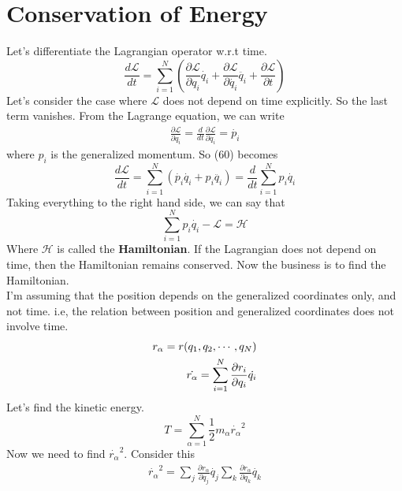 \documentclass[12pt]{article}
\begin{document}
    \section{Conservation of Energy}
    Let's differentiate the Lagrangian operator w.r.t time.
    \begin{equation}
        \frac{d\mathcal{L}}{dt}=\sum_{i=1}^{N}\left(\frac{\partial \mathcal{L}}{\partial q_i}\dot{q_i}+\frac{\partial \mathcal{L}}{\partial \dot{q_i}}\ddot{q_i}+\frac{\partial \mathcal{L}}{\partial t}\right)
    \end{equation}
    Let's consider the case where $\mathcal{L}$ does not depend on time explicitly. So the last term vanishes.
    From the Lagrange equation, we can write 
    \begin{align}
        \frac{\partial \mathcal{L}}{\partial q_i} = \frac{d}{dt}\frac{\partial \mathcal{L}}{\partial \dot{q_i}}=\dot{p_i}
    \end{align}
    where $p_i$ is the generalized momentum. So (60) becomes
    \begin{equation}
        \frac{d\mathcal{L}}{dt}=\sum_{i=1}^{N}\left(\dot{p_i}\dot{q_i}+p_i\ddot{q_i}\right)=\frac{d}{dt}\sum_{i=1}^{N}p_i\dot{q_i}
    \end{equation}
    Taking everything to the right hand side, we can say that
    \begin{equation}
        \sum_{i=1}^{N}p_i\dot{q_i}-\mathcal{L}=\mathcal{H}
    \end{equation}
    Where $\mathcal{H}$ is called the \textbf{Hamiltonian}. If the Lagrangian does not depend on time, then the Hamiltonian remains conserved.
    Now the business is to find the Hamiltonian. \\
    I'm assuming that the position depends on the generalized coordinates only, and not time. i.e, the relation between 
    position and generalized coordinates does not involve time.
    \begin{align}
        r_{\alpha}=r(q_1,q_2,\cdots,q_N) \notag \\ \dot{r_{\alpha}}=\sum_{i=1}^{N}\frac{\partial r_i}{\partial q_i}\dot{q_i}
    \end{align}
    Let's find the kinetic energy.
    \begin{equation}
        T = \sum_{\alpha=1}^{N}\frac{1}{2}m_{\alpha}\dot{r_{\alpha}}^{2}
    \end{equation}
    Now we need to find $\dot{r_{\alpha}}^{2}$. Consider this
    \begin{align}
        \dot{r_{\alpha}}^{2}=\sum_{j}\frac{\partial r_{\alpha}}{\partial q_j}\dot{q_j}\sum_{k}\frac{\partial r_{\alpha}}{\partial q_k}\dot{q_k}
    \end{align}
\end{document}
